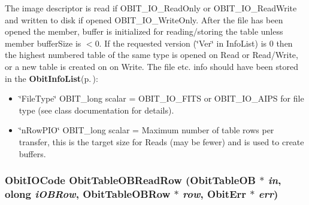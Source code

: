 The image descriptor is read if OBIT\_\-IO\_\-Read\-Only or OBIT\_\-IO\_\-Read\-Write and written to disk if opened OBIT\_\-IO\_\-Write\-Only. After the file has been opened the member, buffer is initialized for reading/storing the table unless member buffer\-Size is $<$0. If the requested version (\char`\"{}Ver\char`\"{} in Info\-List) is 0 then the highest numbered table of the same type is opened on Read or Read/Write, or a new table is created on on Write. The file etc. info should have been stored in the {\bf Obit\-Info\-List}{\rm (p.\,\pageref{structObitInfoList})}: \begin{itemize}
\item \char`\"{}File\-Type\char`\"{} OBIT\_\-long scalar = OBIT\_\-IO\_\-FITS or OBIT\_\-IO\_\-AIPS for file type (see class documentation for details). \item \char`\"{}n\-Row\-PIO\char`\"{} OBIT\_\-long scalar = Maximum number of table rows per transfer, this is the target size for Reads (may be fewer) and is used to create buffers. 
\end{itemize}
\subsubsection{\setlength{\rightskip}{0pt plus 5cm}Obit\-IOCode Obit\-Table\-OBRead\-Row ({\bf Obit\-Table\-OB} $\ast$ {\em in}, {\bf olong} {\em i\-OBRow}, {\bf Obit\-Table\-OBRow} $\ast$ {\em row}, {\bf Obit\-Err} $\ast$ {\em err})}\label{ObitTableOB_8c_a22}


